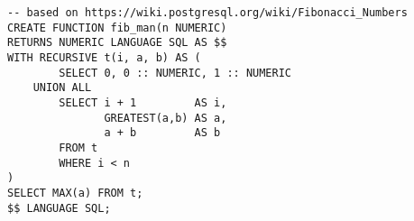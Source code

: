 \begin{verbatim}
-- based on https://wiki.postgresql.org/wiki/Fibonacci_Numbers
CREATE FUNCTION fib_man(n NUMERIC) 
RETURNS NUMERIC LANGUAGE SQL AS $$
WITH RECURSIVE t(i, a, b) AS (
        SELECT 0, 0 :: NUMERIC, 1 :: NUMERIC
    UNION ALL
        SELECT i + 1         AS i, 
               GREATEST(a,b) AS a,
               a + b         AS b 
        FROM t
        WHERE i < n
)
SELECT MAX(a) FROM t;
$$ LANGUAGE SQL;
\end{verbatim}